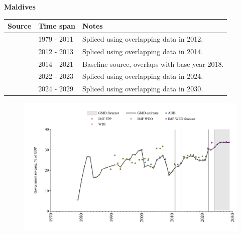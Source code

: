 \documentclass[12pt,a4paper,landscape]{article}
\begin{document}
\begin{adjustbox}{max totalsize={\paperwidth}{\paperheight},center}
\begin{minipage}[t][\textheight][t]{\textwidth}
\vspace*{0.5cm}
{}
\begin{center}
{\Large\bfseries Maldives}
\end{center}
\vspace{0.5cm}
\begin{table}[H]
\centering
\small
\begin{tabular}{|l|l|l|}
\hline
\textbf{Source} & \textbf{Time span} & \textbf{Notes} \\
\hline
\rowcolor{white}\cite{WDI}& 1979 - 2011 &Spliced using overlapping data in 2012.\\
\rowcolor{lightgray}\cite{ADB}& 2012 - 2013 &Spliced using overlapping data in 2014.\\
\rowcolor{white}\cite{WDI}& 2014 - 2021 &Baseline source, overlaps with base year 2018.\\
\rowcolor{lightgray}\cite{ADB}& 2022 - 2023 &Spliced using overlapping data in 2024.\\
\rowcolor{white}\cite{IMF_WEO_forecast}& 2024 - 2029 &Spliced using overlapping data in 2030.\\
\hline
\end{tabular}
\end{table}
\begin{figure}[H]
\centering
\includegraphics[width=\textwidth,height=0.6\textheight,keepaspectratio]{graphs/MDV_govrev_GDP.pdf}
\end{figure}
\end{minipage}
\end{adjustbox}
\end{document}
